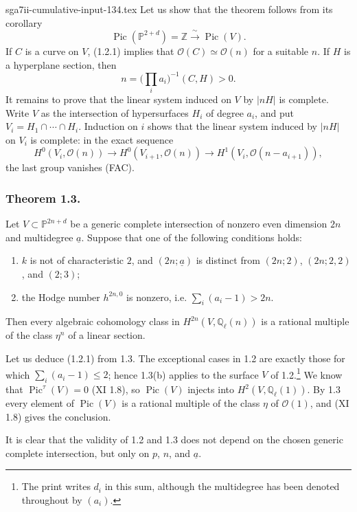 \begin{filecontents*}{sga7ii-cumulative-input-134.tex}
Let us show that the theorem follows from its corollary
\begin{equation}\tag{1.2.1}
\operatorname{Pic}(\mathbb P^{2+d})=\mathbb Z
\xrightarrow{\ \sim\ }\operatorname{Pic}(V).
\end{equation}
If $C$ is a curve on $V$, (1.2.1) implies that
$\mathcal O(C)\simeq\mathcal O(n)$ for a suitable $n$.  If $H$ is a
hyperplane section, then
\[
n=\bigl(\textstyle\prod_i a_i\bigr)^{-1}(C,H)>0.
\]
It remains to prove that the linear system induced on $V$ by $|nH|$ is
complete.  Write $V$ as the intersection of hypersurfaces $H_i$ of degree
$a_i$, and put $V_i=H_1\cap\cdots\cap H_i$.  Induction on $i$ shows that the
linear system induced by $|nH|$ on $V_i$ is complete: in the exact sequence
\[
H^0(V_i,\mathcal O(n))\longrightarrow
H^0(V_{i+1},\mathcal O(n))\longrightarrow
H^1(V_i,\mathcal O(n-a_{i+1})),
\]
the last group vanishes (FAC).

\subsubsection*{Theorem 1.3.}
Let $V\subset\mathbb P^{2n+d}$ be a generic complete intersection of
nonzero even dimension $2n$ and multidegree $\underline a$.  Suppose that
one of the following conditions holds:
\begin{enumerate}[label=(\alph*)]
\item $k$ is not of characteristic $2$, and $(2n;\underline a)$ is distinct
  from $(2n;2)$, $(2n;2,2)$, and $(2;3)$;
\item the Hodge number $h^{2n,0}$ is nonzero, i.e.
  $\sum_i(a_i-1)>2n$.
\end{enumerate}
Then every algebraic cohomology class in
$H^{2n}(V,\mathbb Q_\ell(n))$ is a rational multiple of the class
$\eta^n$ of a linear section.

Let us deduce (1.2.1) from 1.3.  The exceptional cases in 1.2 are exactly
those for which $\sum_i(a_i-1)\leq2$; hence 1.3(b) applies to the surface
$V$ of 1.2.\footnote{The print writes $d_i$ in this sum, although the
multidegree has been denoted throughout by $(a_i)$.}  We know that
$\operatorname{Pic}^{\tau}(V)=0$ (XI 1.8), so
$\operatorname{Pic}(V)$ injects into $H^2(V,\mathbb Q_\ell(1))$.
By 1.3 every element of $\operatorname{Pic}(V)$ is a rational multiple of
the class $\eta$ of $\mathcal O(1)$, and (XI 1.8) gives the conclusion.

It is clear that the validity of 1.2 and 1.3 does not depend on the chosen
generic complete intersection, but only on $p$, $n$, and $\underline a$.


\end{filecontents*}
